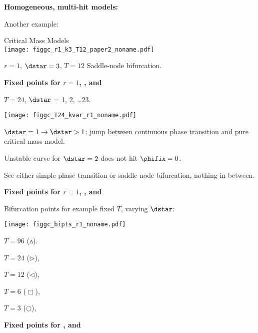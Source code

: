   \textbf{Homogeneous, multi-hit models:}

  
   Another example:
  

  \begin{center}
  Critical Mass Models\\
  \texttt{[image: figgc\_r1\_k3\_T12\_paper2\_noname.pdf]}\\
  \end{center}

  
   $r=1$, $\dstar=3$, $T=12$ \hfill Saddle-node bifurcation.
  
  


 \textbf{Fixed points for $r = 1$, , and }

    
   
   
     $T=24$, $\dstar$ = 1, 2, \ldots 23.
   
   \texttt{[image: figgc\_T24\_kvar\_r1\_noname.pdf]} 
   
   
    
     $\dstar=1 \rightarrow \dstar>1$: 
     jump between continuous phase transition
     and pure critical mass model.
    
     Unstable curve for $\dstar=2$ \alert{does not} hit $\phifix=0$.
   
 
 
  
   See \alert{either} simple phase transition or saddle-node bifurcation,
   nothing in between.
 


 \textbf{Fixed points for $r = 1$, , and }

 
  
   Bifurcation points for example fixed $T$, varying $\dstar$:
 
    
   \texttt{[image: figgc\_bipts\_r1\_noname.pdf]}
   
   
    
     $T=96$ ($\vartriangle$).
    
     $T=24$ ($\triangleright$),
    
     $T=12$ ($\triangleleft$),
    
     $T=6$ ($\Box$),
    
     $T=3$ ($\bigcirc$), 
   

 



  \textbf{Fixed points for , and }

  
  
